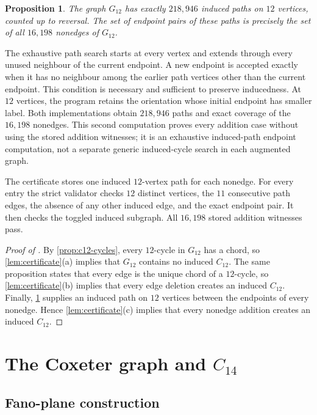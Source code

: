 \documentclass[11pt]{amsart}
\newcommand{\Ck}[1]{C_{#1}}
\newcommand{\Gtwelve}{G_{12}}
\newtheorem{proposition}[proposition]{Proposition}
\theoremstyle{definition}
\theoremstyle{remark}
\begin{document}
\begin{proposition}\label{prop:c12-paths}
The graph \(\Gtwelve\) has exactly \(218{,}946\) induced paths on
\(12\) vertices, counted up to reversal.  The set of endpoint pairs of these
paths is precisely the set of all \(16{,}198\) nonedges of \(\Gtwelve\).
\end{proposition}

The exhaustive path search starts at every vertex and extends through every
unused neighbour of the current endpoint.  A new endpoint is accepted
exactly when it has no neighbour among the earlier path vertices other than
the current endpoint.  This condition is necessary and sufficient to
preserve inducedness.  At \(12\) vertices, the program retains the orientation
whose initial endpoint has smaller label.  Both implementations obtain
\(218{,}946\) paths and exact coverage of the \(16{,}198\) nonedges.  This
second computation proves every addition case without using the stored
addition witnesses; it is an exhaustive induced-path endpoint computation,
not a separate generic induced-cycle search in each augmented graph.

The certificate stores one induced \(12\)-vertex path for each nonedge.
For every entry the strict validator checks \(12\) distinct vertices, the
\(11\) consecutive path edges, the absence of any other induced edge, and
the exact endpoint pair.  It then checks the toggled induced subgraph.
All \(16{,}198\) stored addition witnesses pass.

\begin{proof}[Proof of ]
By \cref{prop:c12-cycles}, every \(12\)-cycle in \(\Gtwelve\) has a chord, so
\cref{lem:certificate}\textup{(a)} implies that \(\Gtwelve\) contains no
induced \(\Ck{12}\).  The same proposition states that every edge is the
unique chord of a \(12\)-cycle, so \cref{lem:certificate}\textup{(b)}
implies that every edge deletion creates an induced \(\Ck{12}\).
Finally, \cref{prop:c12-paths} supplies an induced path on \(12\) vertices
between the endpoints of every nonedge.  Hence
\cref{lem:certificate}\textup{(c)} implies that every nonedge addition
creates an induced \(\Ck{12}\).
\end{proof}

\section{The Coxeter graph and \texorpdfstring{\(\Ck{14}\)}{C14}}
\label{sec:c14}

\subsection{Fano-plane construction}
\end{document}
